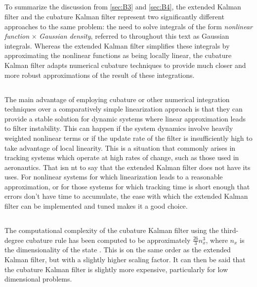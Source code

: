 \subsection{}

To summarize the discussion from \ref{sec:B3} and \ref{sec:B4}, the extended Kalman filter and the cubature Kalman filter represent two significantly different approaches to the same problem: the need to solve integrals of the form \emph{nonlinear function} $\times$ \emph{Gaussian density}, referred to throughout this text as Gaussian integrals. Whereas the extended Kalman filter simplifies these integrals by approximating the nonlinear functions as being locally linear, the cubature Kalman filter adapts numerical cubature techniques to provide much closer and more robust approximations of the result of these integrations.

\subsection{}

The main advantage of employing cubature or other numerical integration techniques over a comparatively simple linearization approach is that they can provide a stable solution for dynamic systems where linear approximation leads to filter instability. This can happen if the system dynamics involve heavily weighted nonlinear terms or if the update rate of the filter is insufficiently high to take advantage of local linearity. This is a situation that commonly arises in tracking systems which operate at high rates of change, such as those used in aeronautics. That isn nt to say that the extended Kalman filter does not have its uses. For nonlinear systems for which linearization leads to a reasonable approximation, or for those systems for which tracking time is short enough that errors don't have time to accumulate, the ease with which the extended Kalman filter can be implemented and tuned makes it a good choice.

\subsection{}

The computational complexity of the cubature Kalman filter using the third-degree cubature rule has been computed to be approximately $\frac{26}{3}n_{x}^{3}$, where $n_{x}$ is the dimensionality of the state \cite[p.62]{Arasaratnam09b}. This is on the same order as the extended Kalman filter, but with a slightly higher scaling factor. It can then be said that the cubature Kalman filter is slightly more expensive, particularly for low dimensional problems.

%

\renewcommand{\refname}{\uppercase{References}}
\renewcommand*{\bibfont}{\footnotesize}
\setlength{\bibsep}{4pt}


